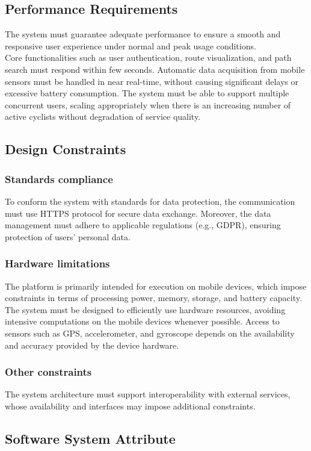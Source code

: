 \subsection{Performance Requirements}
The system must guarantee adequate performance to ensure a smooth and responsive user experience under normal and peak usage conditions.\\[4pt]  
Core functionalities such as user authentication, route visualization, and path search must respond within few seconds. Automatic data acquisition from mobile sensors must be handled in near real-time, without causing significant delays or excessive battery consumption. The system must be able to support multiple concurrent users, scaling appropriately when there is an increasing number of active cyclists without degradation of service quality.
\subsection{Design Constraints}
\subsubsection{Standards compliance}
To conform the system with standards for data protection, the communication must use HTTPS protocol for secure data exchange. Moreover, the data management must adhere to applicable regulations (e.g., GDPR), ensuring protection of users’ personal data.
\subsubsection{Hardware limitations}
The platform is primarily intended for execution on mobile devices, which impose constraints in terms of processing power, memory, storage, and battery capacity.
The system must be designed to efficiently use hardware resources, avoiding intensive computations on the mobile devices whenever possible. Access to sensors such as GPS, accelerometer, and gyroscope depends on the availability and accuracy provided by the device hardware.
\subsubsection{Other constraints}
The system architecture must support interoperability with external services, whose availability and interfaces may impose additional constraints.
\subsection{Software System Attribute}
